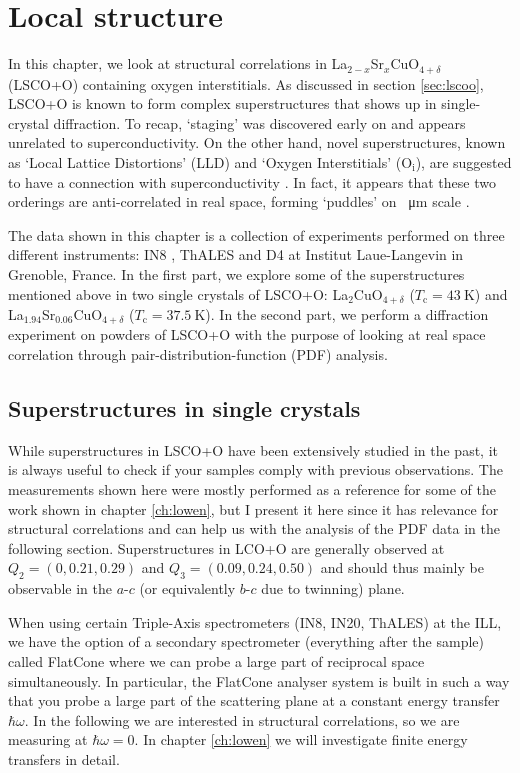 \chapter{Local structure}\label{ch:local}
In this chapter, we look at structural correlations in La$_{2-x}$Sr$_x$CuO$_{4+\delta}$ (LSCO+O) containing oxygen interstitials. As discussed in section \ref{sec:lscoo}, LSCO+O is known to form complex superstructures that shows up in single-crystal diffraction. To recap, `staging' \cite{Wells1997,Ray2017} was discovered early on and appears unrelated to superconductivity. On the other hand, novel superstructures, known as `Local Lattice Distortions' (LLD) and `Oxygen Interstitials' (O$_\text{i}$), are suggested to have a connection with superconductivity \cite{Poccia2011}. In fact, it appears that these two orderings are anti-correlated in real space, forming `puddles' on \SI{}{\micro\meter} scale \cite{Poccia2012}.

The data shown in this chapter is a collection of experiments performed on three different instruments: IN8 \cite{in8}, ThALES and D4 \cite{d4} at Institut Laue-Langevin in Grenoble, France. In the first part, we explore some of the superstructures mentioned above in two single crystals of LSCO+O: La$_2$CuO$_{4+\delta}$ ($T_\text{c} = \SI{43}{\kelvin}$) and La$_{1.94}$Sr$_{0.06}$CuO$_{4+\delta}$ ($T_\text{c} = \SI{37.5}{\kelvin}$). In the second part, we perform a diffraction experiment on powders of LSCO+O with the purpose of looking at real space correlation through pair-distribution-function (PDF) analysis.

\section{Superstructures in single crystals}\label{sec:single_crystal_superstructures}
While superstructures in LSCO+O have been extensively studied in the past, it is always useful to check if your samples comply with previous observations. The measurements shown here were mostly performed as a reference for some of the work shown in chapter \ref{ch:lowen}, but I present it here since it has relevance for structural correlations and can help us with the analysis of the PDF data in the following section. Superstructures in LCO+O are generally observed at $Q_2 = (0, 0.21, 0.29)$ and $Q_3 = (0.09, 0.24, 0.50)$ \cite{Kusmartsev2000} and should thus mainly be observable in the $a$-$c$ (or equivalently $b$-$c$ due to twinning) plane.

When using certain Triple-Axis spectrometers (IN8, IN20, ThALES) at the ILL, we have the option of a secondary spectrometer (everything after the sample) called FlatCone \cite{flatcone} where we can probe a large part of reciprocal space simultaneously. In particular, the FlatCone analyser system is built in such a way that you probe a large part of the scattering plane at a constant energy transfer $\hbar\omega$. In the following we are interested in structural correlations, so we are measuring at $\hbar\omega = 0$. In chapter \ref{ch:lowen} we will investigate finite energy transfers in detail.

